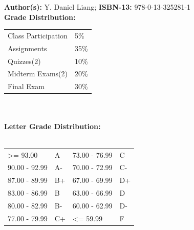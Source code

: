 \documentclass[11pt]{article}
\begin{document}
\textbf {Author(s):} Y. Daniel Liang;  \textbf {ISBN-13:} 978-0-13-325281-1 \\

\textbf {\large Grade Distribution:} \\
\hspace*{40mm}
\begin{tabular}{ l l }
Class Participation & 5\% \\
Assignments & 35\% \\
Quizzes(2)  & 10\% \\
Midterm Exams(2)  & 20\% \\
Final Exam  & 30\%
\end{tabular} \\\\

\textbf {\large Letter Grade Distribution:} \\\\
\hspace*{40mm}
\begin{tabular}{ l l | l l }
\textgreater= 93.00 & A & 73.00 - 76.99 & C \\
90.00 - 92.99 & A-  & 70.00 - 72.99 & C- \\
87.00 - 89.99 & B+  & 67.00 - 69.99 & D+ \\
83.00 - 86.99 & B  & 63.00 - 66.99 & D \\
80.00 - 82.99 & B-  & 60.00 - 62.99 & D- \\
77.00 - 79.99 & C+  & \textless= 59.99 & F \\
\end{tabular} \\
\end{document}
